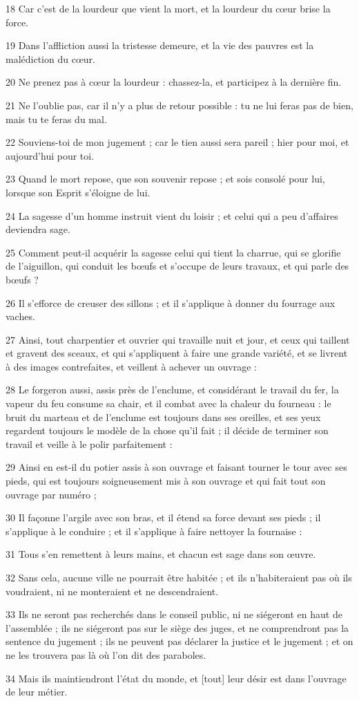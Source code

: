 \par 18 Car c'est de la lourdeur que vient la mort, et la lourdeur du cœur brise la force.
\par 19 Dans l'affliction aussi la tristesse demeure, et la vie des pauvres est la malédiction du cœur.
\par 20 Ne prenez pas à cœur la lourdeur : chassez-la, et participez à la dernière fin.
\par 21 Ne l'oublie pas, car il n'y a plus de retour possible : tu ne lui feras pas de bien, mais tu te feras du mal.
\par 22 Souviens-toi de mon jugement ; car le tien aussi sera pareil ; hier pour moi, et aujourd'hui pour toi.
\par 23 Quand le mort repose, que son souvenir repose ; et sois consolé pour lui, lorsque son Esprit s'éloigne de lui.
\par 24 La sagesse d'un homme instruit vient du loisir ; et celui qui a peu d'affaires deviendra sage.
\par 25 Comment peut-il acquérir la sagesse celui qui tient la charrue, qui se glorifie de l'aiguillon, qui conduit les bœufs et s'occupe de leurs travaux, et qui parle des bœufs ?
\par 26 Il s'efforce de creuser des sillons ; et il s'applique à donner du fourrage aux vaches.
\par 27 Ainsi, tout charpentier et ouvrier qui travaille nuit et jour, et ceux qui taillent et gravent des sceaux, et qui s'appliquent à faire une grande variété, et se livrent à des images contrefaites, et veillent à achever un ouvrage :
\par 28 Le forgeron aussi, assis près de l'enclume, et considérant le travail du fer, la vapeur du feu consume sa chair, et il combat avec la chaleur du fourneau : le bruit du marteau et de l'enclume est toujours dans ses oreilles, et ses yeux regardent toujours le modèle de la chose qu'il fait ; il décide de terminer son travail et veille à le polir parfaitement :
\par 29 Ainsi en est-il du potier assis à son ouvrage et faisant tourner le tour avec ses pieds, qui est toujours soigneusement mis à son ouvrage et qui fait tout son ouvrage par numéro ;
\par 30 Il façonne l'argile avec son bras, et il étend sa force devant ses pieds ; il s'applique à le conduire ; et il s'applique à faire nettoyer la fournaise :
\par 31 Tous s'en remettent à leurs mains, et chacun est sage dans son œuvre.
\par 32 Sans cela, aucune ville ne pourrait être habitée ; et ils n'habiteraient pas où ils voudraient, ni ne monteraient et ne descendraient.
\par 33 Ils ne seront pas recherchés dans le conseil public, ni ne siégeront en haut de l'assemblée ; ils ne siégeront pas sur le siège des juges, et ne comprendront pas la sentence du jugement ; ils ne peuvent pas déclarer la justice et le jugement ; et on ne les trouvera pas là où l'on dit des paraboles.
\par 34 Mais ils maintiendront l'état du monde, et [tout] leur désir est dans l'ouvrage de leur métier.

